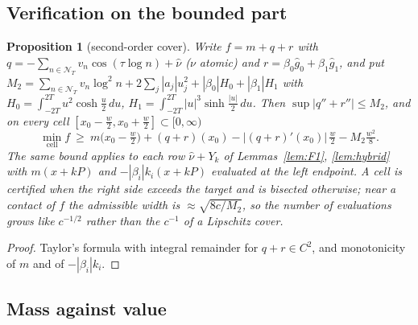 \documentclass[11pt]{amsart}
\newtheorem{proposition}[theorem]{Proposition}
\theoremstyle{definition}
\theoremstyle{remark}
\newcommand{\gh}[1]{\widehat g_{#1}}
\newcommand{\nuh}{\widehat\nu}
\newcommand{\NT}{\mathcal N_T}
\begin{document}
\subsection{Verification on the bounded part}

\begin{proposition}[second-order cover]\label{prop:TAY}
Write $f=m+q+r$ with $q=-\sum_{n\in\NT}v_n\cos(\tau\log n)+\nuh$ ($\nu$ atomic) and
$r=\beta_0\gh0+\beta_1\gh1$, and put
$M_2=\sum_{n\in\NT}v_n\log^2n+2\sum_j|a_j|u_j^2+|\beta_0|H_0+|\beta_1|H_1$ with
$H_0=\int_{-2T}^{2T}u^2\cosh\frac u2\,du$, $H_1=\int_{-2T}^{2T}|u|^3\sinh\frac{|u|}2\,du$. Then
$\sup|q''+r''|\le M_2$, and on every cell $[x_0-\frac w2,x_0+\frac w2]\subset[0,\infty)$
\[
\min_{\text{cell}}f\ \ge\ m\!\big(x_0-\tfrac w2\big)+(q+r)(x_0)-|(q+r)'(x_0)|\,\tfrac w2-M_2\tfrac{w^2}8 .
\]
The same bound applies to each row $\nuh+Y_k$ of Lemmas~\ref{lem:F1}, \ref{lem:hybrid} with
$m(x+kP)$ and $-|\beta_i|k_i(x+kP)$ evaluated at the left endpoint. A cell is certified when the
right side exceeds the target and is bisected otherwise; near a contact of $f$ the admissible width
is $\approx\sqrt{8c/M_2}$, so the number of evaluations grows like $c^{-1/2}$ rather than the
$c^{-1}$ of a Lipschitz cover.
\end{proposition}
\begin{proof}
Taylor's formula with integral remainder for $q+r\in C^2$, and monotonicity of $m$ and of
$-|\beta_i|k_i$.
\end{proof}



\subsection{Mass against value}
\end{document}
